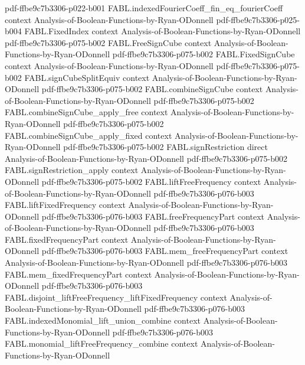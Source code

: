 \begin{theorem}
  {pdf-ffbe9c7b3306-p022-b001}
\proofstep
  {FABL.indexedFourierCoeff_fin_eq_fourierCoeff}
  {context}
  {Analysis-of-Boolean-Functions-by-Ryan-ODonnell}
  {pdf-ffbe9c7b3306-p025-b004}
\proofstep
  {FABL.FixedIndex}
  {context}
  {Analysis-of-Boolean-Functions-by-Ryan-ODonnell}
  {pdf-ffbe9c7b3306-p075-b002}
\proofstep
  {FABL.FreeSignCube}
  {context}
  {Analysis-of-Boolean-Functions-by-Ryan-ODonnell}
  {pdf-ffbe9c7b3306-p075-b002}
\proofstep
  {FABL.FixedSignCube}
  {context}
  {Analysis-of-Boolean-Functions-by-Ryan-ODonnell}
  {pdf-ffbe9c7b3306-p075-b002}
\proofstep
  {FABL.signCubeSplitEquiv}
  {context}
  {Analysis-of-Boolean-Functions-by-Ryan-ODonnell}
  {pdf-ffbe9c7b3306-p075-b002}
\proofstep
  {FABL.combineSignCube}
  {context}
  {Analysis-of-Boolean-Functions-by-Ryan-ODonnell}
  {pdf-ffbe9c7b3306-p075-b002}
\proofstep
  {FABL.combineSignCube_apply_free}
  {context}
  {Analysis-of-Boolean-Functions-by-Ryan-ODonnell}
  {pdf-ffbe9c7b3306-p075-b002}
\proofstep
  {FABL.combineSignCube_apply_fixed}
  {context}
  {Analysis-of-Boolean-Functions-by-Ryan-ODonnell}
  {pdf-ffbe9c7b3306-p075-b002}
\proofstep
  {FABL.signRestriction}
  {direct}
  {Analysis-of-Boolean-Functions-by-Ryan-ODonnell}
  {pdf-ffbe9c7b3306-p075-b002}
\proofstep
  {FABL.signRestriction_apply}
  {context}
  {Analysis-of-Boolean-Functions-by-Ryan-ODonnell}
  {pdf-ffbe9c7b3306-p075-b002}
\proofstep
  {FABL.liftFreeFrequency}
  {context}
  {Analysis-of-Boolean-Functions-by-Ryan-ODonnell}
  {pdf-ffbe9c7b3306-p076-b003}
\proofstep
  {FABL.liftFixedFrequency}
  {context}
  {Analysis-of-Boolean-Functions-by-Ryan-ODonnell}
  {pdf-ffbe9c7b3306-p076-b003}
\proofstep
  {FABL.freeFrequencyPart}
  {context}
  {Analysis-of-Boolean-Functions-by-Ryan-ODonnell}
  {pdf-ffbe9c7b3306-p076-b003}
\proofstep
  {FABL.fixedFrequencyPart}
  {context}
  {Analysis-of-Boolean-Functions-by-Ryan-ODonnell}
  {pdf-ffbe9c7b3306-p076-b003}
\proofstep
  {FABL.mem_freeFrequencyPart}
  {context}
  {Analysis-of-Boolean-Functions-by-Ryan-ODonnell}
  {pdf-ffbe9c7b3306-p076-b003}
\proofstep
  {FABL.mem_fixedFrequencyPart}
  {context}
  {Analysis-of-Boolean-Functions-by-Ryan-ODonnell}
  {pdf-ffbe9c7b3306-p076-b003}
\proofstep
  {FABL.disjoint_liftFreeFrequency_liftFixedFrequency}
  {context}
  {Analysis-of-Boolean-Functions-by-Ryan-ODonnell}
  {pdf-ffbe9c7b3306-p076-b003}
\proofstep
  {FABL.indexedMonomial_lift_union_combine}
  {context}
  {Analysis-of-Boolean-Functions-by-Ryan-ODonnell}
  {pdf-ffbe9c7b3306-p076-b003}
\proofstep
  {FABL.monomial_liftFreeFrequency_combine}
  {context}
  {Analysis-of-Boolean-Functions-by-Ryan-ODonnell}

\end{theorem}
